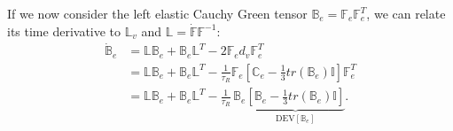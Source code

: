 \documentclass[runningheads]{llncs}
\newcommand{\F}{\ensuremath{\mathbb{F}}}
\newcommand{\LL}{\ensuremath{\mathbb{L}}}
\begin{document}
If we now consider the left elastic Cauchy Green tensor $\mathbb{B}_e=\F_e \F^T_e$, we can relate its time derivative to $\LL_v$ and $\LL=\dot{\F}\F^{-1}$:
\begin{equation}
\begin{aligned}
\dot{\mathbb{B}}_e &= \LL \mathbb{B}_e + \mathbb{B}_e \LL^T - 2 \F_e d_v \F_e^{T} \\
&= \LL\mathbb{B}_e + \mathbb{B}_e \LL^T - \frac{1}{\tau_R} \F_e\left[\mathbb{C}_e-\frac{1}{3}tr(\mathbb{B}_e)\mathbb{I}\right]\F_e^T\\
&= \LL\mathbb{B}_e + \mathbb{B}_e \LL^T - \frac{1}{\tau_R} \,\mathbb{B}_e\underbrace{\left[\mathbb{B}_e-\frac{1}{3}tr(\mathbb{B}_e)\mathbb{I}\right]}_{\text{DEV}[\mathbb{B}_e]}.
\end{aligned}
\end{equation}
\end{document}
